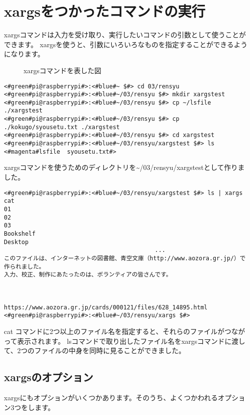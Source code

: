 \newpage
\section{xargsをつかったコマンドの実行}
xargsコマンドは入力を受け取り、実行したいコマンドの引数として使うことができます。
xargsを使うと、引数にいろいろなものを指定することができるようになります。
\begin{figure}[h]
    \centering
    
    \caption{xargsコマンドを表した図}
    \label{ch03:xargs_command}
\end{figure}
\begin{lstlisting}[caption=xargsコマンドを使う準備をする]
<#green#pi@raspberrypi#>:<#blue#~ $#> cd 03/rensyu
<#green#pi@raspberrypi#>:<#blue#~/03/rensyu $#> mkdir xargstest
<#green#pi@raspberrypi#>:<#blue#~/03/rensyu $#> cp ~/lsfile ./xargstest
<#green#pi@raspberrypi#>:<#blue#~/03/rensyu $#> cp ./kokugo/syousetu.txt ./xargstest
<#green#pi@raspberrypi#>:<#blue#~/03/rensyu $#> cd xargstest
<#green#pi@raspberrypi#>:<#blue#~/03/rensyu/xargstest $#> ls
<#magenta#lsfile  syousetu.txt#>
\end{lstlisting}
xargsコマンドを使うためのディレクトリを\textasciitilde /03/rensyu/xargstestとして作りました。

\newpage
\begin{lstlisting}[caption=xargsコマンドを使ってcatコマンドを使う]
<#green#pi@raspberrypi#>:<#blue#~/03/rensyu/xargstest $#> ls | xargs cat
01
02
03
Bookshelf
Desktop
                                           ...
このファイルは、インターネットの図書館、青空文庫（http://www.aozora.gr.jp/）で作られました。
入力、校正、制作にあたったのは、ボランティアの皆さんです。



https://www.aozora.gr.jp/cards/000121/files/628_14895.html
<#green#pi@raspberrypi#>:<#blue#~/03/rensyu/xargs $#>
\end{lstlisting}
cat コマンドに2つ以上のファイル名を指定すると、それらのファイルがつながって表示されます。
lsコマンドで取り出したファイル名をxargsコマンドに渡して、2つのファイルの中身を同時に見ることができました。


\subsection{xargsのオプション}
xargsにもオプションがいくつかあります。そのうち、よくつかわれるオプション3つをします。

